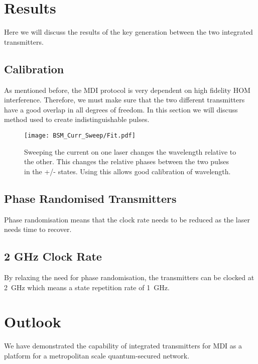 \section{Results}

Here we will discuss the results of the key generation between the two integrated transmitters.

\subsection{Calibration}

As mentioned before, the \ac{MDI} protocol is very dependent on high fidelity \ac{HOM} interference. Therefore, we must make sure that the two different transmitters have a good overlap in all degrees of freedom. In this section we will discuss method used to create indistinguishable pulses.

\begin{figure}[tbp]
	\centering
	\texttt{[image: BSM\_Curr\_Sweep/Fit.pdf]}
	\caption[Laser current-error sweep]{Sweeping the current on one laser changes the wavelength relative to the other. This changes the relative phases between the two pulses in the +/- states. Using this allows good calibration of wavelength.}
	\label{fig:wavelength_cal}
\end{figure}


\subsection{Phase Randomised Transmitters}

Phase randomisation means that the clock rate needs to be reduced as the laser needs time to recover. 

\subsection{2 GHz Clock Rate}

By relaxing the need for phase randomisation, the transmitters can be clocked at \SI{2}{GHz} which means a state repetition rate of \SI{1}{GHz}.

\section{Outlook}

We have demonstrated the capability of integrated transmitters for \acl{MDI} as a platform for a metropolitan scale quantum-secured network. 

